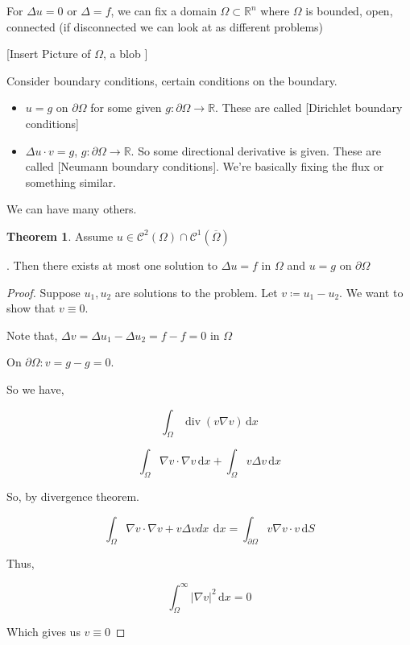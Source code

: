 \documentclass{article}
\theoremstyle{definition}
\newtheorem{theorem}{Theorem}
\begin{document}
For \(\Delta u = 0\) or \(\Delta = f\), we can fix a domain \(\Omega \subset \mathbb{R} ^n\) where \(\Omega \) is bounded, open, connected (if disconnected we can look at as different problems)

[Insert Picture of \(\Omega \), a blob ]

Consider boundary conditions, certain conditions on the boundary.

\begin{itemize}
    \item \(u = g\) on \(\partial \Omega \) for some given \(g:\partial \Omega \to \mathbb{R} \). These are called [Dirichlet boundary conditions]
    \item \(\Delta u\cdot v = g\), \(g:\partial \Omega \to \mathbb{R}\). So some directional derivative is given. These are called [Neumann boundary conditions]. We're basically fixing the flux or something similar.
\end{itemize}

We can have many others.

\begin{theorem}
    Assume \(u \in \mathcal{C}^2(\Omega)\cap \mathcal{C}^1(\overline{\Omega} )\) 
\end{theorem}. Then there exists at most one solution to \(\Delta u = f\) in \(\Omega\) and \(u=g\) on \(\partial \Omega \) 

\begin{proof}   
    Suppose \(u_1,u_2\) are solutions to the problem. Let \(v \coloneqq u_1 - u_2\). We want to show that \(v\equiv 0\).

    Note that, \(\Delta v = \Delta u_1 - \Delta u_2 = f-f = 0\) in \(\Omega\)

    On \(\partial \Omega : v = g - g = 0\).
    
    So we have,
    
    \[
        \int_{\Omega}^{} \operatorname{div}(v \nabla v)  \,\mathrm{d}x 
    \] 

    \[
        \int_{\Omega }^{} \nabla v\cdot \nabla v \,\mathrm{d}x + \int_{\Omega }^{} v \Delta v \,\mathrm{d}x  
    \]

    So, by divergence theorem.

    \[
        \int_{\Omega }^{} \nabla v\cdot \nabla v + v \Delta v dx\ \,\mathrm{d}x = \int_{\partial \Omega }^{} v \nabla v \cdot v \,\mathrm{d}S  
    \]
    
    Thus,
    
    \[
        \int_{\Omega }^{\infty} \vert \nabla v \vert ^2 \,\mathrm{d}x = 0
    \]

    Which gives us \(v \equiv 0\) 

\end{proof} 
\end{document}
